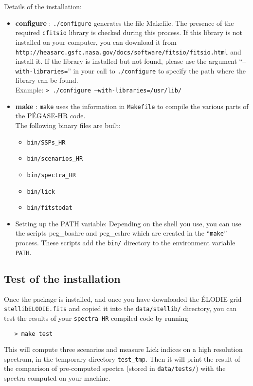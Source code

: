 \documentclass[11pt,fleqn]{article}
\begin{document}
Details of the installation:
\begin{itemize}
\item{\bf configure} : \texttt{./configure} generates the file
        Makefile.  The presence of the required \texttt{cfitsio}
        library is checked during this process. If this library is not
        installed on your computer, you can download it from
        \texttt{http://heasarc.gsfc.nasa.gov/docs/software/fitsio/fitsio.html}
        and install it. If the library is installed but not found,
        please use the argument ``\texttt{--with-libraries=}'' in your
        call to \texttt{./configure} to specify the path where the
        library can be found.\\ Example: \texttt{> ./configure
        --with-libraries=/usr/lib/}

\item{\bf make} : \texttt{make} uses the information in
\texttt{Makefile} to compile the various parts of the P\'EGASE-HR
code. \\ The following binary files are built:
\begin{itemize}
\item{\texttt{bin/SSPs\_HR}}
\item{\texttt{bin/scenarios\_HR}}
\item{\texttt{bin/spectra\_HR}}
\item{\texttt{bin/lick}}
\item{\texttt{bin/fitstodat}}
\end{itemize}


\item{Setting up the PATH variable}: Depending on the shell you use, 
you can use the scripts peg\_bashrc and
peg\_cshrc which are created in the ``\texttt{make}'' process. These
scripts add the \texttt{bin/} directory to the environment variable
\texttt{PATH}.

\end{itemize}

\subsection{Test of the installation}
Once the package is installed, and once you have downloaded the \'ELODIE
grid \texttt{stellibELODIE.fits} and copied it into the
\texttt{data/stellib/} directory, you can test the results of your
\texttt{spectra\_HR} compiled code by running
\begin{verbatim}
   > make test
\end{verbatim}
This will compute three scenarios and measure Lick indices on a high
resolution spectrum, in the
temporary directory \texttt{test\_tmp}. Then it will print the result of the
comparison of pre-computed spectra (stored in \texttt{data/tests/})
with the spectra computed on your machine.
\end{document}
